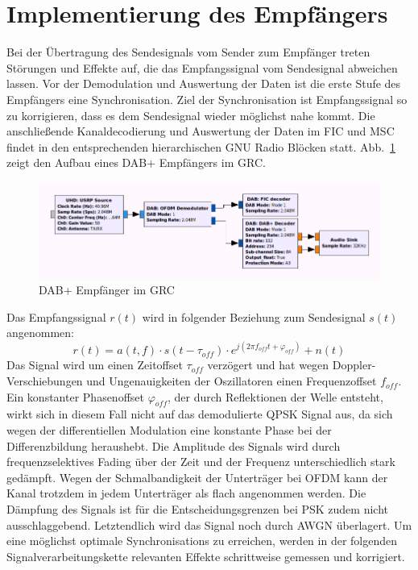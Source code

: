 \let\conjugatet\overline
\section{Implementierung des Empfängers}
\label{sec:impl_des_receivers}
Bei der Übertragung des Sendesignals vom Sender zum Empfänger treten Störungen und Effekte auf, die das Empfangssignal vom Sendesignal abweichen lassen. Vor der Demodulation und Auswertung der Daten ist die erste Stufe des Empfängers eine Synchronisation. Ziel der Synchronisation ist Empfangssignal so zu korrigieren, dass es dem Sendesignal wieder möglichst nahe kommt. Die anschließende Kanaldecodierung und Auswertung der Daten im FIC und MSC findet in den entsprechenden hierarchischen GNU Radio Blöcken statt. Abb.~\ref{fig:grc_receiver} zeigt den Aufbau eines DAB+ Empfängers im GRC.

\begin{figure}[h]
\centering
  \includegraphics[width=\textwidth]{figures/GRC_receiver.png}
	\caption{DAB+ Empfänger im GRC}
	\label{fig:grc_receiver}
\end{figure}

Das Empfangssignal $r(t)$ wird in folgender Beziehung zum Sendesignal $s(t)$ angenommen:
\begin{equation}
r(t) = a(t,f) \cdot s(t-\tau_{off}) \cdot e^{j(2 \pi f_{off} t + \varphi_{off})} + n(t)
\end{equation}
Das Signal wird um einen Zeitoffset $\tau_{off}$ verzögert und hat wegen Doppler-Verschiebungen und Ungenauigkeiten der Oszillatoren einen Frequenzoffset $f_{off}$. Ein konstanter Phasenoffset $\varphi_{off}$, der durch Reflektionen der Welle entsteht, wirkt sich in diesem Fall nicht auf das demodulierte QPSK Signal aus, da sich wegen der differentiellen Modulation eine konstante Phase bei der Differenzbildung heraushebt.  Die Amplitude des Signals wird durch frequenzselektives Fading über der Zeit und der Frequenz unterschiedlich stark gedämpft. Wegen der Schmalbandigkeit der Unterträger bei OFDM kann der Kanal trotzdem in jedem Unterträger als flach angenommen werden. Die Dämpfung des Signals ist für die Entscheidungsgrenzen bei PSK zudem nicht ausschlaggebend. Letztendlich wird das Signal noch durch \ac{AWGN} überlagert. 
Um eine möglichst optimale Synchronisations zu erreichen, werden in der folgenden Signalverarbeitungskette relevanten Effekte schrittweise gemessen und korrigiert.

